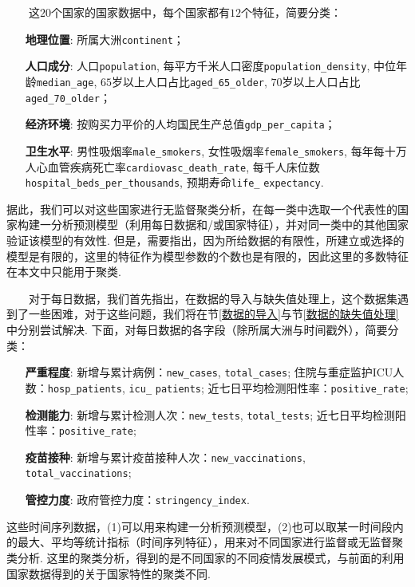 \documentclass[a4paper, titlepage]{article}
\begin{document}
        　　这$20$个国家的国家数据中，每个国家都有$12$个特征，简要分类：
        {\kaishu
        \begin{itemize}[itemsep=-1pt,topsep=1pt]
            \item [\textbf{地理位置}:]所属大洲\texttt{continent}；
            \item [\textbf{人口成分}:]人口\texttt{population}, 每平方千米人口密度\texttt{population\_density}, 中位年龄\texttt{median\_age}, $65$岁以上人口占比\texttt{aged\_65\_older}, $70$岁以上人口占比\texttt{aged\_70\_older}；
            \item [\textbf{经济环境}:]按购买力平价的人均国民生产总值\texttt{gdp\_per\_capita}；
            \item [\textbf{卫生水平}:]男性吸烟率\texttt{male\_smokers}, 女性吸烟率\texttt{female\_smokers}, 每年每十万人心血管疾病死亡率\texttt{cardiovasc\_death\_rate}, 每千人床位数\texttt{hospital\_beds\_per\_thousands}, 预期寿命\texttt{life\_} \texttt{expectancy}.
        \end{itemize}
        }
        据此，我们可以对这些国家进行无监督聚类分析，在每一类中选取一个代表性的国家构建一分析预测模型（利用每日数据和/或国家特征），并对同一类中的其他国家验证该模型的有效性. 但是，需要指出，因为所给数据的有限性，所建立或选择的模型是有限的，这里的特征作为模型参数的个数也是有限的，因此这里的多数特征在本文中只能用于聚类.

        　　对于每日数据，我们首先指出，在数据的导入与缺失值处理上，这个数据集遇到了一些困难，对于这些问题，我们将在节\ref{数据的导入}与节\ref{数据的缺失值处理}中分别尝试解决. 下面，对每日数据的各字段（除所属大洲与时间戳外），简要分类：
        {\kaishu
        \begin{itemize}[itemsep=-1pt,topsep=1pt]
            \item [\textbf{严重程度}:] 新增与累计病例：\texttt{new\_cases}, \texttt{total\_cases}; 住院与重症监护ICU人数：\texttt{hosp\_patients}, \texttt{icu\_} \texttt{patients}; 近七日平均检测阳性率：\texttt{positive\_rate};
            \item [\textbf{检测能力}:] 新增与累计检测人次：\texttt{new\_tests}, \texttt{total\_tests}; 近七日平均检测阳性率：\texttt{positive\_rate};
            \item [\textbf{疫苗接种}:] 新增与累计疫苗接种人次：\texttt{new\_vaccinations}, \texttt{total\_vaccinations}; 
            \item [\textbf{管控力度}:] 政府管控力度：\texttt{stringency\_index}.
        \end{itemize}
        }
        这些时间序列数据，(1)可以用来构建一分析预测模型，(2)也可以取某一时间段内的最大、平均等统计指标（时间序列特征），用来对不同国家进行监督或无监督聚类分析. 这里的聚类分析，得到的是不同国家的不同疫情发展模式，与前面的利用国家数据得到的关于国家特性的聚类不同.
\end{document}
